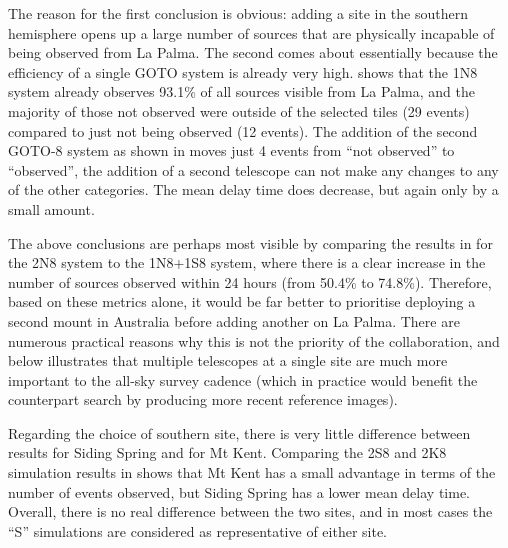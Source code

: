 \begin{colsection}
\begin{colsection}
The reason for the first conclusion is obvious: adding a site in the southern hemisphere opens up a large number of sources that are physically incapable of being observed from La Palma. The second comes about essentially because the efficiency of a single GOTO system is already very high.  shows that the 1N8 system already observes 93.1\% of all sources visible from La Palma, and the majority of those not observed were outside of the selected tiles (29 events) compared to just not being observed (12 events). The addition of the second GOTO-8 system as shown in  moves just 4 events from ``not observed'' to ``observed'', the addition of a second telescope can not make any changes to any of the other categories. The mean delay time does decrease, but again only by a small amount.

The above conclusions are perhaps most visible by comparing the results in  for the 2N8 system to the 1N8+1S8 system, where there is a clear increase in the number of sources observed within 24 hours (from 50.4\% to 74.8\%). Therefore, based on these metrics alone, it would be far better to prioritise deploying a second mount in Australia before adding another on La Palma. There are numerous practical reasons why this is not the priority of the collaboration, and  below illustrates that multiple telescopes at a single site are much more important to the all-sky survey cadence (which in practice would benefit the counterpart search by producing more recent reference images).

Regarding the choice of southern site, there is very little difference between results for Siding Spring and for Mt Kent. Comparing the 2S8 and 2K8 simulation results in  shows that Mt Kent has a small advantage in terms of the number of events observed, but Siding Spring has a lower mean delay time. Overall, there is no real difference between the two sites, and in most cases the ``S'' simulations are considered as representative of either site.


\end{colsection}
\end{colsection}
